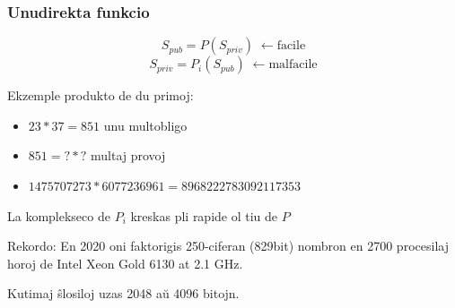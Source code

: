 \documentclass[utf8, aspectratio=169]{beamer}
\begin{document}
\begin{frame}
  \frametitle{Unudirekta funkcio}
  \[ S_{pub} = P(S_{priv}) \; \longleftarrow \text{facile}\]
  \[ S_{priv} = P_i(S_{pub}) \; \longleftarrow \text{malfacile}\]

  \pause
  \vspace{1em}
  Ekzemple produkto de du primoj:

  \pause
  \begin{itemize}
  \item $23 * 37 = 851$ unu multobligo
  \item $851 = ? * ?$ multaj provoj
  \item $1475707273*6077236961 = 8968222783092117353$
  \end{itemize}

  \pause
  La komplekseco de $P_i$ kreskas pli rapide ol tiu de $P$

  \pause
  \vspace{0.5em}
  Rekordo: En 2020 oni faktorigis 250-ciferan (829bit) nombron en 2700
  procesilaj horoj de Intel Xeon Gold 6130 at 2.1 GHz.

  \vspace{0.5em}
  Kutimaj ŝlosiloj uzas 2048 aŭ 4096 bitojn.
\end{frame}
\end{document}
